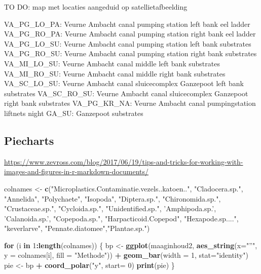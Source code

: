 \documentclass[]{article}
\newenvironment{Shaded}{\begin{snugshade}}{\end{snugshade}}
\newcommand{\KeywordTok}[1]{\textcolor[rgb]{0.13,0.29,0.53}{\textbf{#1}}}
\newcommand{\DataTypeTok}[1]{\textcolor[rgb]{0.13,0.29,0.53}{#1}}
\newcommand{\DecValTok}[1]{\textcolor[rgb]{0.00,0.00,0.81}{#1}}
\newcommand{\StringTok}[1]{\textcolor[rgb]{0.31,0.60,0.02}{#1}}
\newcommand{\ControlFlowTok}[1]{\textcolor[rgb]{0.13,0.29,0.53}{\textbf{#1}}}
\newcommand{\OperatorTok}[1]{\textcolor[rgb]{0.81,0.36,0.00}{\textbf{#1}}}
\newcommand{\NormalTok}[1]{#1}
\begin{document}
TO DO: map met locaties aangeduid op satellietafbeelding

VA\_PG\_LO\_PA: Veurne Ambacht canal pumping station left bank eel
ladder VA\_PG\_RO\_PA: Veurne Ambacht canal pumping station right bank
eel ladder VA\_PG\_LO\_SU: Veurne Ambacht canal pumping station left
bank substrates VA\_PG\_RO\_SU: Veurne Ambacht canal pumping station
right bank substrates VA\_MI\_LO\_SU: Veurne Ambacht canal middle left
bank substrates VA\_MI\_RO\_SU: Veurne Ambacht canal middle right bank
substrates VA\_SC\_LO\_SU: Veurne Ambacht canal sluicecomplex Ganzepoot
left bank substrates VA\_SC\_RO\_SU: Veurne Ambacht canal sluicecomplex
Ganzepoot right bank substrates VA\_PG\_KR\_NA: Veurne Ambacht canal
pumpingstation liftnets night GA\_SU: Ganzepoot substrates

\subsection{Piecharts}\label{piecharts}

\url{https://www.zevross.com/blog/2017/06/19/tips-and-tricks-for-working-with-images-and-figures-in-r-markdown-documents/}

\begin{Shaded}
\begin{Highlighting}[]
\NormalTok{colnames <-}\StringTok{ }\KeywordTok{c}\NormalTok{(}\StringTok{"Microplastics.Contaminatie.vezels..katoen.."}\NormalTok{, }\StringTok{"Cladocera.sp."}\NormalTok{, }\StringTok{"Annelida"}\NormalTok{, }\StringTok{"Polychaete"}\NormalTok{, }\StringTok{"Isopoda"}\NormalTok{, }\StringTok{"Diptera.sp."}\NormalTok{, }\StringTok{"Chironomida.sp."}\NormalTok{, }\StringTok{"Crustaceae.sp."}\NormalTok{, }\StringTok{"Cycloida.sp."}\NormalTok{, }\StringTok{"Unidentified.sp."}\NormalTok{, }\StringTok{'Amphipoda.sp.'}\NormalTok{, }\StringTok{'Calanoida.sp.'}\NormalTok{, }\StringTok{"Copepoda.sp."}\NormalTok{, }\StringTok{"Harpacticoid.Copepod"}\NormalTok{, }\StringTok{"Hexapode.sp...."}\NormalTok{, }\StringTok{"keverlarve"}\NormalTok{, }\StringTok{"Pennate.diatomee"}\NormalTok{,}\StringTok{"Plantae.sp."}\NormalTok{)}

\ControlFlowTok{for}\NormalTok{ (i }\ControlFlowTok{in} \DecValTok{1}\OperatorTok{:}\KeywordTok{length}\NormalTok{(colnames)) \{}
\NormalTok{  bp <-}\StringTok{ }\KeywordTok{ggplot}\NormalTok{(maaginhoud2, }\KeywordTok{aes_string}\NormalTok{(}\DataTypeTok{x=}\StringTok{"''"}\NormalTok{, }\DataTypeTok{y =}\NormalTok{ colnames[i], }\DataTypeTok{fill =} \StringTok{"Methode"}\NormalTok{)) }\OperatorTok{+}
\StringTok{    }\KeywordTok{geom_bar}\NormalTok{(}\DataTypeTok{width =} \DecValTok{1}\NormalTok{, }\DataTypeTok{stat=}\StringTok{"identity"}\NormalTok{)}
\NormalTok{  pie <-}\StringTok{ }\NormalTok{bp }\OperatorTok{+}\StringTok{ }\KeywordTok{coord_polar}\NormalTok{(}\StringTok{"y"}\NormalTok{, }\DataTypeTok{start=} \DecValTok{0}\NormalTok{)}
  \KeywordTok{print}\NormalTok{(pie)}
\NormalTok{\}}
\end{Highlighting}
\end{Shaded}
\end{document}
